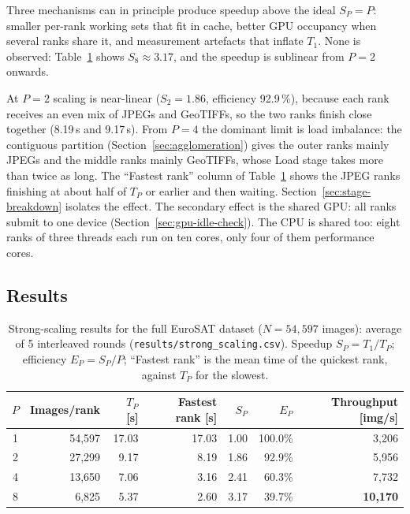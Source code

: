 \documentclass[a4paper,12pt]{report}
\begin{document}
Three mechanisms can in principle produce speedup above the ideal $S_P = P$: smaller
per-rank working sets that fit in cache, better GPU occupancy when several ranks
share it, and measurement artefacts that inflate $T_1$. None is observed:
Table~\ref{tab:strong-scaling} shows $S_8 \approx 3.17$, and the speedup is sublinear
from $P = 2$ onwards.

At $P=2$ scaling is near-linear ($S_2 = 1.86$, efficiency 92.9\,\%),
because each rank receives an even mix of JPEGs and GeoTIFFs, so the two
ranks finish close together (8.19\,s and 9.17\,s). From $P=4$ the dominant
limit is load imbalance: the contiguous partition
(Section~\ref{sec:agglomeration}) gives the outer ranks mainly JPEGs and
the middle ranks mainly GeoTIFFs, whose Load stage takes more than twice
as long. The ``Fastest rank'' column of Table~\ref{tab:strong-scaling}
shows the JPEG ranks finishing at about half of $T_P$ or earlier and then waiting.
Section~\ref{sec:stage-breakdown} isolates the effect. The secondary
effect is the shared GPU: all ranks submit to one device
(Section~\ref{sec:gpu-idle-check}). The CPU is shared too: eight ranks
of three threads each run on ten cores, only four of them performance
cores.

\subsection{Results}

\begin{table}[H]
\centering
\caption{Strong-scaling results for the full EuroSAT dataset
($N = 54{,}597$ images): average of 5 interleaved rounds (\texttt{results\slash{}strong\_\discretionary{}{}{}scaling.csv}).
Speedup $S_P = T_1/T_P$; efficiency $E_P = S_P/P$; ``Fastest rank'' is
the mean time of the quickest rank, against $T_P$ for the slowest.}
\label{tab:strong-scaling}
\begin{tabular}{@{}crrrrrr@{}}
\toprule
$P$ & \textbf{Images/rank} & $T_P$ [s] & \textbf{Fastest rank} [s] &
$S_P$ & $E_P$ & \textbf{Throughput [img/s]} \\
\midrule
1 & 54,597 & 17.03 & 17.03 & 1.00 & 100.0\% & 3,206 \\
2 & 27,299 &  9.17 &  8.19 & 1.86 &  92.9\% & 5,956 \\
4 & 13,650 &  7.06 &  3.16 & 2.41 &  60.3\% & 7,732 \\
8 &  6,825 &  5.37 &  2.60 & 3.17 &  39.7\% & \textbf{10,170} \\
\bottomrule
\end{tabular}
\end{table}
\end{document}
